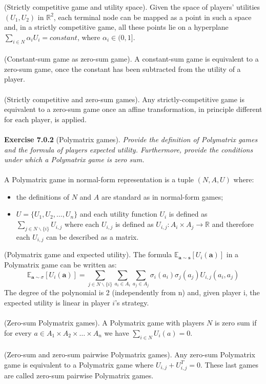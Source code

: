 (Strictly competitive game and utility space). Given the space of players’ utilities $ (U_1,U_2) $ in $ \mathbb{R}^2 $, each terminal node can be mapped as a point in such a space and, in a strictly competitive game, all these points lie on a hyperplane $ \sum_{i \in N} \alpha_{i} U_{i} = constant $, where $ \alpha_{i} \in (0, 1] $.\\\\
(Constant-sum game as zero-sum game). A constant-sum game is equivalent to a zero-sum game, once the constant has been subtracted from the utility of a player.\\\\
(Strictly competitive and zero-sum games). Any strictly-competitive game is equivalent to a zero-sum game once an affine transformation, in principle different for each player, is applied.\\\\
\textbf{Exercise 7.0.2} (Polymatrix games). \textit{Provide the definition of Polymatrix games and the formula of players expected utility. Furthermore, provide the conditions under which a Polymatrix game is zero sum.}\\\\
A Polymatrix game in normal-form representation is a tuple $ (N, A, U) $ where:
\begin{itemize}
\item the definitions of $ N $ and $ A $ are standard as in normal-form games;
\item $ U = \{ U_{1}, U_{2}, \ldots, U_{n} \} $ and each utility function $ U_{i} $ is defined as\\
$ \sum_{j \in N \backslash\{i\}} U_{i, j} $ where each $ U_{i, j} $ is defined as $ U_{i, j}: A_{i} \times A_{j} \rightarrow \mathbb{R} $ and therefore each $ U_{i, j} $ can be described as a matrix.
\end{itemize}
(Polymatrix game and expected utility). The formula $ \mathbb{E}_{\mathbf{a} \sim \mathbf{s}} [U_{i}(\mathbf{a})] $ in a Polymatrix game can be written as:
$$
\mathbb{E}_{\mathbf{a} \sim \sigma} [U_{i}(\mathbf{a}) ] = \sum_{j \in N \backslash\{i\}} \sum_{a_{i} \in A_{i}} \sum_{a_{j} \in A_{j}} \sigma_{i} (a_{i}) \sigma_{j} (a_{j}) U_{i, j} (a_{i}, a_{j})
$$
The degree of the polynomial is 2 (independently from n) and, given player i, the expected utility is linear
in player $ i $’s strategy.\\\\
(Zero-sum Polymatrix games). A Polymatrix game with players $ N $ is zero sum if for every $ a \in A_1 \times A_2 \times \ldots \times A_n $ we have $ \sum_{i \in N} U_{i}(a) = 0 $.\\\\
(Zero-sum and zero-sum pairwise Polymatrix games). Any zero-sum Polymatrix game is equivalent to a Polymatrix game where $ U_{i,j} + U_{i,j}^T = 0 $. These last games are called zero-sum pairwise Polymatrix
games.


